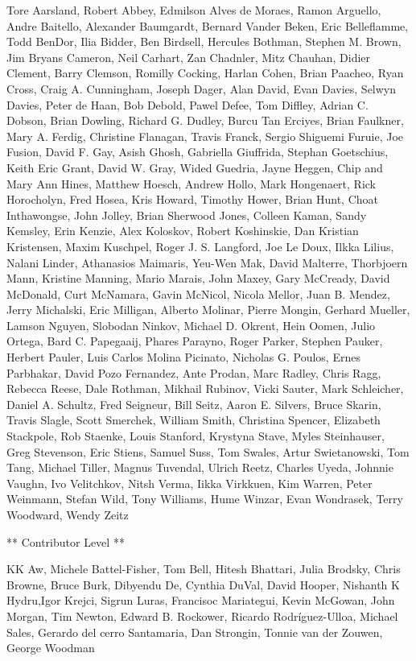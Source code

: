 \documentclass[]{memoir}
\begin{document}
Tore Aarsland, Robert Abbey, Edmilson Alves de Moraes, Ramon Arguello,
Andre Baitello, Alexander Baumgardt, Bernard Vander Beken, Eric
Belleflamme, Todd BenDor, Ilia Bidder, Ben Birdsell, Hercules Bothman,
Stephen M. Brown, Jim Bryans Cameron, Neil Carhart, Zan Chadnler, Mitz
Chauhan, Didier Clement, Barry Clemson, Romilly Cocking, Harlan Cohen,
Brian Paacheo, Ryan Cross, Craig A. Cunningham, Joseph Dager, Alan
David, Evan Davies, Selwyn Davies, Peter de Haan, Bob Debold, Pawel
Defee, Tom Diffley, Adrian C. Dobson, Brian Dowling, Richard G. Dudley,
Burcu Tan Erciyes, Brian Faulkner, Mary A. Ferdig, Christine Flanagan,
Travis Franck, Sergio Shiguemi Furuie, Joe Fusion, David F. Gay, Asish
Ghosh, Gabriella Giuffrida, Stephan Goetschius, Keith Eric Grant, David
W. Gray, Wided Guedria, Jayne Heggen, Chip and Mary Ann Hines, Matthew
Hoesch, Andrew Hollo, Mark Hongenaert, Rick Horocholyn, Fred Hosea, Kris
Howard, Timothy Hower, Brian Hunt, Choat Inthawongse, John Jolley, Brian
Sherwood Jones, Colleen Kaman, Sandy Kemsley, Erin Kenzie, Alex
Koloskov, Robert Koshinskie, Dan Kristian Kristensen, Maxim Kuschpel,
Roger J. S. Langford, Joe Le Doux, Ilkka Lilius, Nalani Linder,
Athanasios Maimaris, Yeu-Wen Mak, David Malterre, Thorbjoern Mann,
Kristine Manning, Mario Marais, John Maxey, Gary McCready, David
McDonald, Curt McNamara, Gavin McNicol, Nicola Mellor, Juan B. Mendez,
Jerry Michalski, Eric Milligan, Alberto Molinar, Pierre Mongin, Gerhard
Mueller, Lamson Nguyen, Slobodan Ninkov, Michael D. Okrent, Hein Oomen,
Julio Ortega, Bard C. Papegaaij, Phares Parayno, Roger Parker, Stephen
Pauker, Herbert Pauler, Luis Carlos Molina Picinato, Nicholas G. Poulos,
Ernes Parbhakar, David Pozo Fernandez, Ante Prodan, Marc Radley, Chris
Ragg, Rebecca Reese, Dale Rothman, Mikhail Rubinov, Vicki Sauter, Mark
Schleicher, Daniel A. Schultz, Fred Seigneur, Bill Seitz, Aaron E.
Silvers, Bruce Skarin, Travis Slagle, Scott Smerchek, William Smith,
Christina Spencer, Elizabeth Stackpole, Rob Staenke, Louis Stanford,
Krystyna Stave, Myles Steinhauser, Greg Stevenson, Eric Stiens, Samuel
Suss, Tom Swales, Artur Swietanowski, Tom Tang, Michael Tiller, Magnus
Tuvendal, Ulrich Reetz, Charles Uyeda, Johnnie Vaughn, Ivo Velitchkov,
Nitsh Verma, Iikka Virkkuen, Kim Warren, Peter Weinmann, Stefan Wild,
Tony Williams, Hume Winzar, Evan Wondrasek, Terry Woodward, Wendy Zeitz

** Contributor Level **

KK Aw, Michele Battel-Fisher, Tom Bell, Hitesh Bhattari, Julia Brodsky,
Chris Browne, Bruce Burk, Dibyendu De, Cynthia DuVal, David Hooper,
Nishanth K Hydru,Igor Krejci, Sigrun Luras, Francisoc Mariategui, Kevin
McGowan, John Morgan, Tim Newton, Edward B. Rockower, Ricardo
Rodríguez-Ulloa, Michael Sales, Gerardo del cerro Santamaria, Dan
Strongin, Tonnie van der Zouwen, George Woodman
\end{document}
